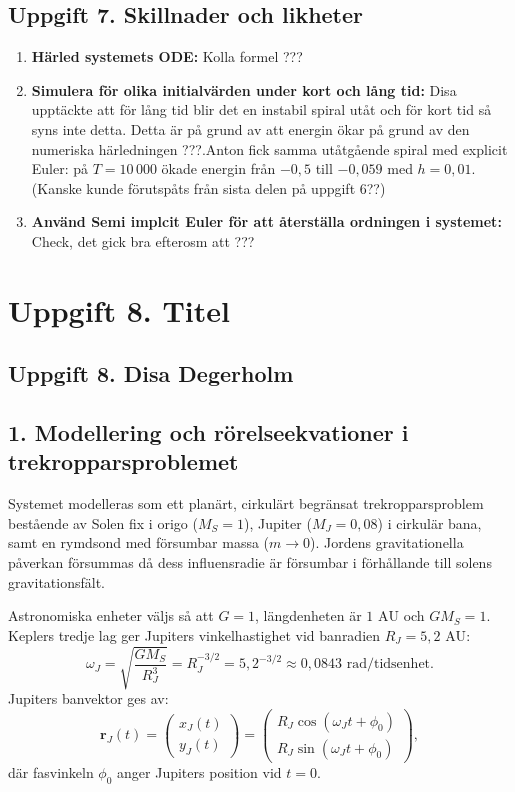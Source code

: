\documentclass{article}
\begin{document}
\subsection*{Uppgift 7. Skillnader och likheter}

\begin{enumerate}
    \item \textbf{Härled systemets ODE:} Kolla formel ???
    \item \textbf{Simulera för olika initialvärden under kort och lång tid:} Disa upptäckte att för lång tid blir det en instabil spiral utåt och för kort tid så syns inte detta. Detta är på grund av att energin ökar på grund av den numeriska härledningen ???.Anton fick samma utåtgående spiral med explicit Euler: på $T = 10\,000$ ökade
    energin från $-0{,}5$ till $-0{,}059$ med $h = 0{,}01$. (Kanske kunde förutspåts från sista delen på uppgift 6??)
    \item \textbf{Använd Semi implcit Euler för att återställa ordningen i systemet:} Check, det gick bra efterosm att ???
\end{enumerate}

\section*{Uppgift 8. Titel}

\subsection*{Uppgift 8. Disa Degerholm}


\subsection*{1. Modellering och rörelseekvationer i trekropparsproblemet}
Systemet modelleras som ett planärt, cirkulärt begränsat trekropparsproblem bestående av Solen fix i origo ($M_S = 1$), Jupiter ($M_J = 0{,}08$) i cirkulär bana, samt en rymdsond med försumbar massa ($m \to 0$). Jordens gravitationella påverkan försummas då dess influensradie är försumbar i förhållande till solens gravitationsfält.

Astronomiska enheter väljs så att $G = 1$, längdenheten är $1\text{ AU}$ och $G M_S = 1$. Keplers tredje lag ger Jupiters vinkelhastighet vid banradien $R_J = 5{,}2\text{ AU}$:
\begin{equation}
    \omega_J = \sqrt{\frac{G M_S}{R_J^3}} = R_J^{-3/2} = 5{,}2^{-3/2} \approx 0{,}0843\text{ rad/tidsenhet}.
\end{equation}
Jupiters banvektor ges av:
\begin{equation}
    \mathbf{r}_J(t) = \begin{pmatrix} x_J(t) \\ y_J(t) \end{pmatrix} = \begin{pmatrix} R_J \cos(\omega_J t + \phi_0) \\ R_J \sin(\omega_J t + \phi_0) \end{pmatrix},
\end{equation}
där fasvinkeln $\phi_0$ anger Jupiters position vid $t = 0$.
\end{document}

